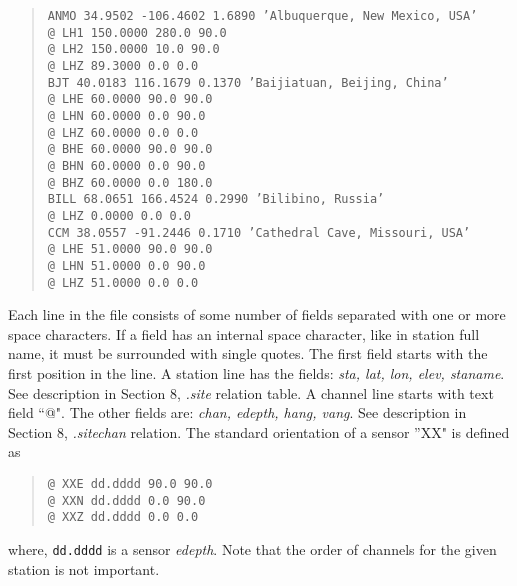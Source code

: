 \begin{quote}
\texttt{ANMO 34.9502 -106.4602    1.6890 'Albuquerque, New Mexico, USA' \\
@ LH1  150.0000  280.0   90.0 \\
@ LH2  150.0000   10.0   90.0 \\
@ LHZ   89.3000    0.0    0.0 \\
BJT  40.0183  116.1679    0.1370 'Baijiatuan, Beijing, China' \\
@  LHE   60.0000   90.0   90.0 \\
@  LHN   60.0000    0.0   90.0 \\
@  LHZ   60.0000    0.0    0.0 \\
@  BHE   60.0000   90.0   90.0 \\
@  BHN   60.0000    0.0   90.0 \\
@  BHZ   60.0000    0.0    180.0 \\
BILL  68.0651  166.4524    0.2990 'Bilibino, Russia' \\
@       LHZ   0.0000    0.0    0.0 \\
CCM  38.0557  -91.2446    0.1710 'Cathedral Cave, Missouri, USA' \\
@   LHE   51.0000   90.0   90.0 \\
@   LHN   51.0000    0.0   90.0 \\
@   LHZ   51.0000    0.0    0.0 }
\end{quote}
Each line in the file consists of some number of fields separated with
one or more space characters. If a field has an internal space 
character, like in station full name, it must be surrounded with  
single quotes.  The first field starts with the first position in the 
line. A station line has the fields:
{\it sta, lat, lon, elev, staname}. See description in Section 8, {\it .site}
relation table. A channel line starts with text field ``@". The other
fields are: {\it chan, edepth, hang, vang}. See description in Section 
8, {\it .sitechan} relation. The standard orientation of a sensor ''XX"
is defined as
\begin{quote}
\texttt{@   XXE   dd.dddd   90.0   90.0 \\
@   XXN   dd.dddd    0.0   90.0 \\
@   XXZ   dd.dddd    0.0    0.0 }
\end{quote}
where, \texttt{dd.dddd} is a sensor {\it edepth}.
Note that the order of channels for the given station is not important.
\newpage
